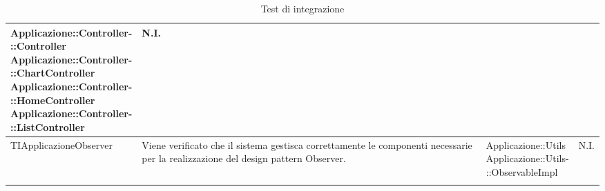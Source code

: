 \begin{longtabu}{| X | X | X[0.9] | X[0.3] |}
{			Applicazione::Controller-\\::Controller\\
			Applicazione::Controller-\\::ChartController\\
			Applicazione::Controller-\\::HomeController\\
			Applicazione::Controller-\\::ListController}
			& N.I.
\\ \hline
			TIApplicazioneObserver &
			Viene verificato che il sistema gestisca correttamente le componenti necessarie per la realizzazione del design pattern Observer.
			& \parbox[t]{0.6\textwidth}{
			Applicazione::Utils\\
			Applicazione::Utils-\\::ObservableImpl}
			& N.I. 
\\ \hline

\caption{Test di integrazione}

\end{longtabu}



